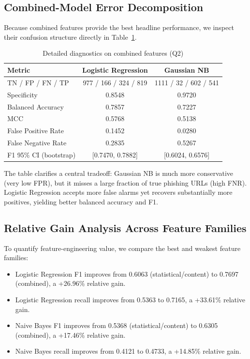 \subsection{Combined-Model Error Decomposition}

Because combined features provide the best headline performance, we inspect their confusion structure directly in Table~\ref{tab:q2-combined-diagnostics}.

\begin{table}[H]
\centering
\caption{Detailed diagnostics on combined features (Q2)}
\label{tab:q2-combined-diagnostics}
\scriptsize
\setlength{\tabcolsep}{3.5pt}
\begin{tabular}{lcc}
\toprule
Metric & Logistic Regression & Gaussian NB \\
\midrule
TN / FP / FN / TP & 977 / 166 / 324 / 819 & 1111 / 32 / 602 / 541 \\
Specificity & 0.8548 & 0.9720 \\
Balanced Accuracy & 0.7857 & 0.7227 \\
MCC & 0.5768 & 0.5138 \\
False Positive Rate & 0.1452 & 0.0280 \\
False Negative Rate & 0.2835 & 0.5267 \\
F1 95\% CI (bootstrap) & [0.7470, 0.7882] & [0.6024, 0.6576] \\
\bottomrule
\end{tabular}
\end{table}

The table clarifies a central tradeoff: Gaussian NB is much more conservative (very low FPR), but it misses a large fraction of true phishing URLs (high FNR). Logistic Regression accepts more false alarms yet recovers substantially more positives, yielding better balanced accuracy and F1.

\subsection{Relative Gain Analysis Across Feature Families}

To quantify feature-engineering value, we compare the best and weakest feature families:
\begin{itemize}
    \item Logistic Regression F1 improves from 0.6063 (statistical/content) to 0.7697 (combined), a +26.96\% relative gain.
    \item Logistic Regression recall improves from 0.5363 to 0.7165, a +33.61\% relative gain.
    \item Naive Bayes F1 improves from 0.5368 (statistical/content) to 0.6305 (combined), a +17.46\% relative gain.
    \item Naive Bayes recall improves from 0.4121 to 0.4733, a +14.85\% relative gain.
\end{itemize}

